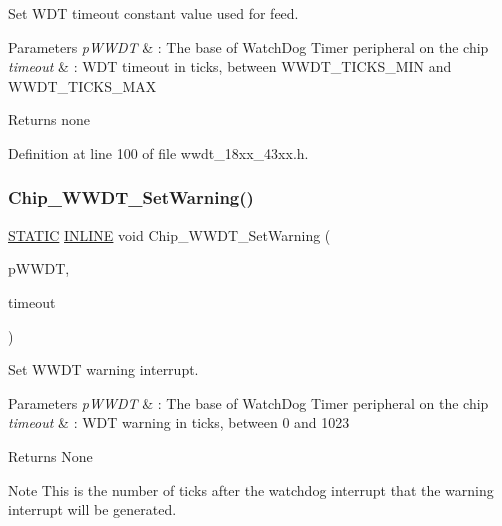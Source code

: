 Set W\+DT timeout constant value used for feed. 


\begin{DoxyParams}{Parameters}
{\em p\+W\+W\+DT} & \+: The base of Watch\+Dog Timer peripheral on the chip \\
\hline
{\em timeout} & \+: W\+DT timeout in ticks, between W\+W\+D\+T\+\_\+\+T\+I\+C\+K\+S\+\_\+\+M\+IN and W\+W\+D\+T\+\_\+\+T\+I\+C\+K\+S\+\_\+\+M\+AX \\
\hline
\end{DoxyParams}
\begin{DoxyReturn}{Returns}
none 
\end{DoxyReturn}


Definition at line 100 of file wwdt\+\_\+18xx\+\_\+43xx.\+h.

\mbox{\label{group___w_w_d_t__18_x_x__43_x_x_ga83ecb3bc2ce68b3deb8343a7d76e3d7e}} 
\subsubsection{\texorpdfstring{Chip\+\_\+\+W\+W\+D\+T\+\_\+\+Set\+Warning()}{Chip\_WWDT\_SetWarning()}}
{\footnotesize\ttfamily \hyperlink{group___l_p_c___types___public___macros_ga10b2d890d871e1489bb02b7e70d9bdfb}{S\+T\+A\+T\+IC} \hyperlink{spifi__18xx__43xx_8h_a2eb6f9e0395b47b8d5e3eeae4fe0c116}{I\+N\+L\+I\+NE} void Chip\+\_\+\+W\+W\+D\+T\+\_\+\+Set\+Warning (\begin{DoxyParamCaption}\item[{\hyperlink{struct_l_p_c___w_w_d_t___t}{L\+P\+C\+\_\+\+W\+W\+D\+T\+\_\+T} $\ast$}]{p\+W\+W\+DT,  }\item[{uint32\+\_\+t}]{timeout }\end{DoxyParamCaption})}



Set W\+W\+DT warning interrupt. 


\begin{DoxyParams}{Parameters}
{\em p\+W\+W\+DT} & \+: The base of Watch\+Dog Timer peripheral on the chip \\
\hline
{\em timeout} & \+: W\+DT warning in ticks, between 0 and 1023 \\
\hline
\end{DoxyParams}
\begin{DoxyReturn}{Returns}
None 
\end{DoxyReturn}
\begin{DoxyNote}{Note}
This is the number of ticks after the watchdog interrupt that the warning interrupt will be generated. 
\end{DoxyNote}


